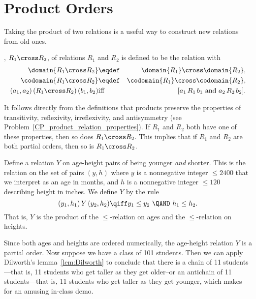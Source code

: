 \section{Product Orders}\label{prodsec}

Taking the product of two relations is a useful way to construct new
relations from old ones.

\begin{definition}\label{productrel}
, $R_1 \cross R_2$, of relations
$R_1$ and $R_2$ is defined to be the relation with
\begin{eqnarray*}
\domain{R_1 \cross R_2} &\eqdef& \domain{R_1} \cross \domain{R_2},\\
\codomain{R_1 \cross R_2} &\eqdef& \codomain{R_1} \cross \codomain{R_2},\\
(a_1,a_2)\, (R_1 \cross R_2)\, (b_1,b_2) &\text{iff}& [a_1\, R_1\, b_1
\text{ and } a_2\, R_2\, b_2].
\end{eqnarray*}

\end{definition}

It follows directly from the definitions that products preserve the
properties of transitivity, reflexivity, irreflexivity, and
antisymmetry (see Problem~\ref{CP_product_relation_properties}).  If
$R_1$ and $R_2$ both have one of these properties, then so does $R_1
\cross R_2$.  This implies that if $R_1$ and $R_2$ are both partial
orders, then so is $R_1 \cross R_2$.

\begin{example}\label{Y}
Define a relation $Y$ on age-height pairs of being younger \emph{and}
shorter.  This is the relation on the set of pairs $(y,h)$ where $y$ is a
nonnegative integer $\le 2400$ that we interpret as an age in months, and $h$
is a nonnegative integer $\le 120$ describing height in inches.  We define $Y$
by the rule
\[
(y_1,h_1)\, Y\, (y_2,h_2) \qiff y_1 \le y_2\ \QAND\ h_1 \le h_2.
\]
That is, $Y$ is the product of the $\le$-relation on ages and the
$\le$-relation on heights.

Since both ages and heights are ordered numerically, the age-height
relation $Y$ is a partial order.  Now suppose we have a class of 101
students.  Then we can apply Dilworth's lemma~\ref{lem:Dilworth} to
conclude that there is a chain of 11 students---that is, 11 students who
get taller as they get older--or an antichain of 11 students---that
is, 11 students who get taller as they get younger, which makes for an
amusing in-class demo.
\end{example}

